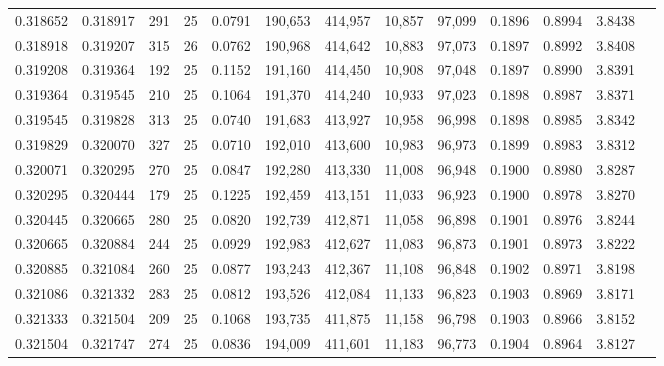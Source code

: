 \begin{tabular}{rrrrrrrrrrrrr}
0.318652 & 0.318917 &   291 &  25 &                                     0.0791 & 190,653 & 414,957 &  10,857 &  97,099 & 0.1896 & 0.8994 & 3.8438 \\
0.318918 & 0.319207 &   315 &  26 &                                     0.0762 & 190,968 & 414,642 &  10,883 &  97,073 & 0.1897 & 0.8992 & 3.8408 \\
0.319208 & 0.319364 &   192 &  25 &                                     0.1152 & 191,160 & 414,450 &  10,908 &  97,048 & 0.1897 & 0.8990 & 3.8391 \\
0.319364 & 0.319545 &   210 &  25 &                                     0.1064 & 191,370 & 414,240 &  10,933 &  97,023 & 0.1898 & 0.8987 & 3.8371 \\
0.319545 & 0.319828 &   313 &  25 &                                     0.0740 & 191,683 & 413,927 &  10,958 &  96,998 & 0.1898 & 0.8985 & 3.8342 \\
0.319829 & 0.320070 &   327 &  25 &                                     0.0710 & 192,010 & 413,600 &  10,983 &  96,973 & 0.1899 & 0.8983 & 3.8312 \\
0.320071 & 0.320295 &   270 &  25 &                                     0.0847 & 192,280 & 413,330 &  11,008 &  96,948 & 0.1900 & 0.8980 & 3.8287 \\
0.320295 & 0.320444 &   179 &  25 &                                     0.1225 & 192,459 & 413,151 &  11,033 &  96,923 & 0.1900 & 0.8978 & 3.8270 \\
0.320445 & 0.320665 &   280 &  25 &                                     0.0820 & 192,739 & 412,871 &  11,058 &  96,898 & 0.1901 & 0.8976 & 3.8244 \\
0.320665 & 0.320884 &   244 &  25 &                                     0.0929 & 192,983 & 412,627 &  11,083 &  96,873 & 0.1901 & 0.8973 & 3.8222 \\
0.320885 & 0.321084 &   260 &  25 &                                     0.0877 & 193,243 & 412,367 &  11,108 &  96,848 & 0.1902 & 0.8971 & 3.8198 \\
0.321086 & 0.321332 &   283 &  25 &                                     0.0812 & 193,526 & 412,084 &  11,133 &  96,823 & 0.1903 & 0.8969 & 3.8171 \\
0.321333 & 0.321504 &   209 &  25 &                                     0.1068 & 193,735 & 411,875 &  11,158 &  96,798 & 0.1903 & 0.8966 & 3.8152 \\
0.321504 & 0.321747 &   274 &  25 &                                     0.0836 & 194,009 & 411,601 &  11,183 &  96,773 & 0.1904 & 0.8964 & 3.8127 \\

\end{tabular}
